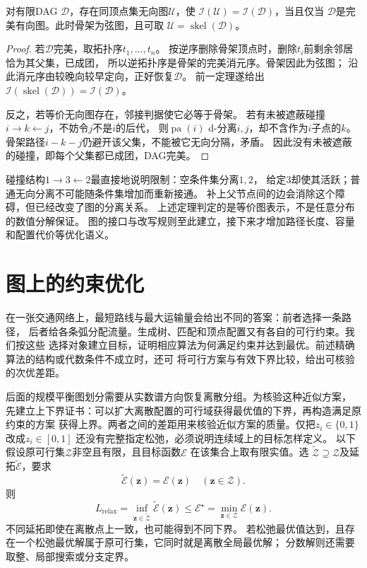 \begin{theorem}[有向图的完美无向图表示]
  \label{thm:graph-theory-perfect-undirected}
  对有限DAG \(\mathcal D\)，存在同顶点集无向图\(\mathcal U\)，使
  \(\mathcal I(\mathcal U)=\mathcal I(\mathcal D)\)，当且仅当
  \(\mathcal D\)是完美有向图。此时骨架为弦图，且可取
  \(\mathcal U=\operatorname{skel}(\mathcal D)\)。
\end{theorem}

\begin{proof}
若\(\mathcal D\)完美，取拓扑序\(t_1,\ldots,t_n\)。
按逆序删除骨架顶点时，删除\(t_i\)前剩余邻居恰为其父集，已成团，
所以逆拓扑序是骨架的完美消元序。骨架因此为弦图；
沿此消元序由较晚向较早定向，正好恢复\(\mathcal D\)。
前一定理遂给出
\(\mathcal I(\operatorname{skel}(\mathcal D))=\mathcal I(\mathcal D)\)。

反之，若等价无向图存在，邻接判据使它必等于骨架。
若有未被遮蔽碰撞\(i\to k\leftarrow j\)，不妨令\(j\)不是\(i\)的后代，
则\(\operatorname{pa}(i)\) d-分离\(i,j\)，却不含作为\(i\)子点的\(k\)。
骨架路径\(i-k-j\)仍避开该父集，不能被它无向分隔，矛盾。
因此没有未被遮蔽的碰撞，即每个父集都已成团，DAG完美。
\end{proof}

碰撞结构\(1\to3\leftarrow2\)最直接地说明限制：空条件集分离\(1,2\)，
给定\(3\)却使其活跃；普通无向分离不可能随条件集增加而重新接通。
补上父节点间的边会消除这个障碍，但已经改变了图的分离关系。
上述定理判定的是等价图表示，不是任意分布的数值分解保证。
图的接口与改写规则至此建立，接下来才增加路径长度、容量和配置代价等优化语义。

\section{图上的约束优化}
\label{sec:graph-theory-exact-approximate-algorithms}

在一张交通网络上，最短路线与最大运输量会给出不同的答案：前者选择一条路径，
后者给各条弧分配流量。生成树、匹配和顶点配置又有各自的可行约束。我们按这些
选择对象建立目标，证明相应算法为何满足约束并达到最优。前述精确算法的结构或代数条件不成立时，还可
将可行方案与有效下界比较，给出可核验的次优差距。

后面的规模平衡图划分需要从实数谱方向恢复离散分组。为核验这种近似方案，
先建立上下界证书：可以扩大离散配置的可行域获得最优值的下界，再构造满足原约束的方案
获得上界。两者之间的差距用来核验近似方案的质量。仅把\(z_i\in\{0,1\}\)改成\(z_i\in[0,1]\)
还没有完整指定松弛，必须说明连续域上的目标怎样定义。
以下假设原可行集\(\mathcal Z\)非空且有限，且目标函数\(\mathcal E\)
在该集合上取有限实值。选
\(\widetilde{\mathcal Z}\supseteq\mathcal Z\)及延拓\(\widetilde{\mathcal E}\)，要求
\[
  \widetilde{\mathcal E}(\bm z)=\mathcal E(\bm z)\quad(\bm z\in\mathcal Z).
\]
则
\[
  L_{\mathrm{relax}}
  =\inf_{\bm z\in\widetilde{\mathcal Z}}\widetilde{\mathcal E}(\bm z)
  \leq \mathcal E^\star
  =\min_{\bm z\in\mathcal Z}\mathcal E(\bm z).
\]
不同延拓即使在离散点上一致，也可能得到不同下界。
若松弛最优值达到，且存在一个松弛最优解属于原可行集，它同时就是离散全局最优解；
分数解则还需要取整、局部搜索或分支定界。

